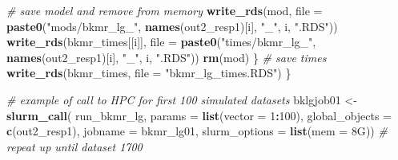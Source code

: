 \documentclass[12pt, twoside]{amherstthesis}
\newenvironment{Shaded}{\begin{snugshade}}{\end{snugshade}}
\newcommand{\AttributeTok}[1]{\textcolor[rgb]{0.13,0.29,0.53}{#1}}
\newcommand{\CommentTok}[1]{\textcolor[rgb]{0.56,0.35,0.01}{\textit{#1}}}
\newcommand{\DecValTok}[1]{\textcolor[rgb]{0.00,0.00,0.81}{#1}}
\newcommand{\FunctionTok}[1]{\textcolor[rgb]{0.13,0.29,0.53}{\textbf{#1}}}
\newcommand{\NormalTok}[1]{#1}
\newcommand{\OtherTok}[1]{\textcolor[rgb]{0.56,0.35,0.01}{#1}}
\newcommand{\SpecialCharTok}[1]{\textcolor[rgb]{0.81,0.36,0.00}{\textbf{#1}}}
\newcommand{\StringTok}[1]{\textcolor[rgb]{0.31,0.60,0.02}{#1}}
\begin{document}
\begin{Shaded}
\begin{Highlighting}[]
    \CommentTok{\# save model and remove from memory}
    \FunctionTok{write\_rds}\NormalTok{(mod, }\AttributeTok{file =} \FunctionTok{paste0}\NormalTok{(}\StringTok{"mods/bkmr\_lg\_"}\NormalTok{, }\FunctionTok{names}\NormalTok{(out2\_resp1)[i], }\StringTok{"\_"}\NormalTok{, i, }\StringTok{".RDS"}\NormalTok{))}
    \FunctionTok{write\_rds}\NormalTok{(bkmr\_times[[i]], }\AttributeTok{file =} 
                \FunctionTok{paste0}\NormalTok{(}\StringTok{"times/bkmr\_lg\_"}\NormalTok{, }\FunctionTok{names}\NormalTok{(out2\_resp1)[i], }\StringTok{"\_"}\NormalTok{, i, }\StringTok{".RDS"}\NormalTok{))}
    \FunctionTok{rm}\NormalTok{(mod)}
\NormalTok{  \}}
  \CommentTok{\# save times}
  \FunctionTok{write\_rds}\NormalTok{(bkmr\_times, }\AttributeTok{file =} \StringTok{"bkmr\_lg\_times.RDS"}\NormalTok{)}
\NormalTok{\}}

\CommentTok{\# example of call to HPC for first 100 simulated datasets}
\NormalTok{bklgjob01 }\OtherTok{\textless{}{-}} \FunctionTok{slurm\_call}\NormalTok{(}
\NormalTok{  run\_bkmr\_lg, }\AttributeTok{params =} \FunctionTok{list}\NormalTok{(}\AttributeTok{vector =} \DecValTok{1}\SpecialCharTok{:}\DecValTok{100}\NormalTok{),}
  \AttributeTok{global\_objects =} \FunctionTok{c}\NormalTok{(}\StringTok{\textquotesingle{}out2\_resp1\textquotesingle{}}\NormalTok{),}
  \AttributeTok{jobname =} \StringTok{\textquotesingle{}bkmr\_lg01\textquotesingle{}}\NormalTok{,}
  \AttributeTok{slurm\_options =} \FunctionTok{list}\NormalTok{(}\AttributeTok{mem =} \StringTok{\textquotesingle{}8G\textquotesingle{}}\NormalTok{))}
  \CommentTok{\# repeat up until dataset 1700}
\end{Highlighting}
\end{Shaded}
\normalsize
\end{document}
